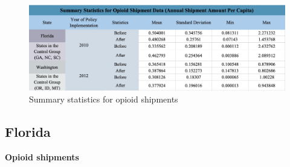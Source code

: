\documentclass[12pt,letterpaper]{article}
\begin{document}
\begin{figure}[!h]
  \centering
\includegraphics[width=0.7\linewidth]{../30_results/General_Results/shipment_statistic_analysis.png}
  \caption{Summary statistics for opioid shipments}
  \label{fig:sum_ship}
\end{figure} 

\subsection{Florida}

\textbf{Opioid shipments}
\end{document}
